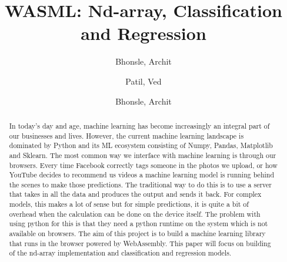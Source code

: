 \documentclass[a4paper,12pt]{report}
\title{WASML: Nd-array, Classification and Regression}
\author{
  Bhonsle, Archit\\
  \and
  Patil, Ved\\
  \and
  Bhonsle, Archit\\
}
\begin{document}
\maketitle
\tableofcontents

\begin{abstract}
  In today’s day and age, machine learning has become increasingly an
  integral part of our businesses and lives. However, the current machine
  learning landscape is dominated by Python and its ML ecosystem consisting
  of Numpy, Pandas, Matplotlib and Sklearn. The most common way we
  interface with machine learning is through our browsers. Every time
  Facebook correctly tags someone in the photos we upload, or how YouTube
  decides to recommend us videos a machine learning model is running behind
  the scenes to make those predictions. The traditional way to do this is
  to use a server that takes in all the data and produces the output and
  sends it back. For complex models, this makes a lot of sense but for
  simple predictions, it is quite a bit of overhead when the calculation
  can be done on the device itself. The problem with using python for this
  is that they need a python runtime on the system which is not available
  on browsers. The aim of this project is to build a machine learning
  library that runs in the browser powered by WebAssembly. This paper will
  focus on building of the nd-array implementation and classification and
  regression models.
\end{abstract}
\end{document}
